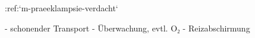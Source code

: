 :ref:`m-praeeklampsie-verdacht`
\begin{itemize}
    -   schonender Transport
    -   Überwachung, evtl. O₂
    -   Reizabschirmung
\end{itemize}